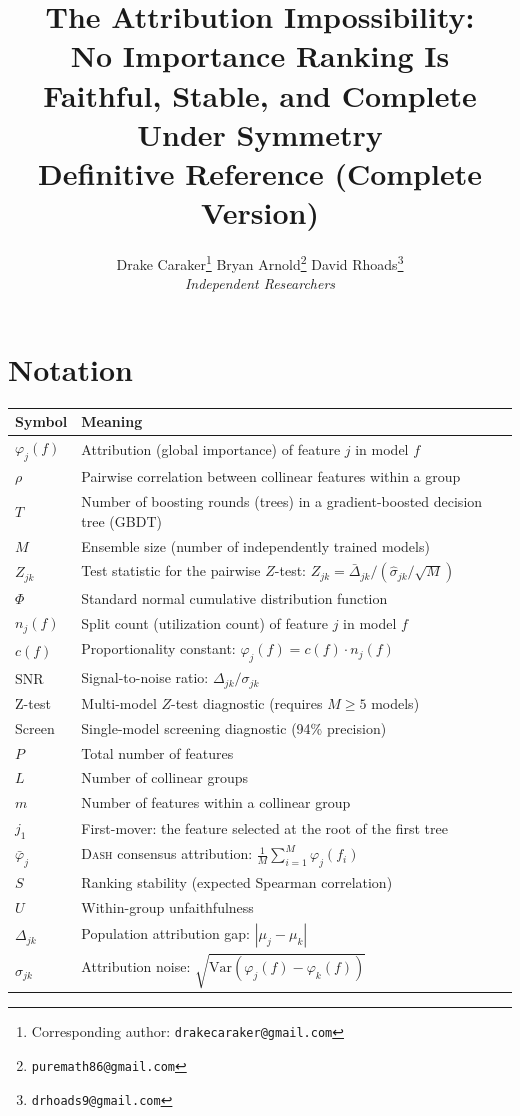 \documentclass{article}
\title{The Attribution Impossibility:\\{\large No Importance Ranking Is Faithful, Stable, and Complete Under Symmetry}\\[8pt]\normalsize Definitive Reference (Complete Version)}
\author{
  Drake Caraker\thanks{Corresponding author: \texttt{drakecaraker@gmail.com}} \quad
  Bryan Arnold\thanks{\texttt{puremath86@gmail.com}} \quad
  David Rhoads\thanks{\texttt{drhoads9@gmail.com}} \\[4pt]
  \textit{Independent Researchers}
}
\newcommand{\Var}{\mathrm{Var}}
\newcommand{\DASH}{\textsc{Dash}}
\begin{document}
\maketitle
\tableofcontents

\section*{Notation}
\label{sec:notation}
\begin{center}
\small
\begin{tabular}{@{}lp{10cm}@{}}
\toprule
\textbf{Symbol} & \textbf{Meaning} \\
\midrule
$\varphi_j(f)$ & Attribution (global importance) of feature $j$ in model $f$ \\
$\rho$ & Pairwise correlation between collinear features within a group \\
$T$ & Number of boosting rounds (trees) in a gradient-boosted decision tree (GBDT) \\
$M$ & Ensemble size (number of independently trained models) \\
$Z_{jk}$ & Test statistic for the pairwise $Z$-test: $Z_{jk} = \bar\Delta_{jk} / (\hat\sigma_{jk}/\sqrt{M})$ \\
$\Phi$ & Standard normal cumulative distribution function \\
$n_j(f)$ & Split count (utilization count) of feature $j$ in model $f$ \\
$c(f)$ & Proportionality constant: $\varphi_j(f) = c(f) \cdot n_j(f)$ \\
$\text{SNR}$ & Signal-to-noise ratio: $\Delta_{jk}/\sigma_{jk}$ \\
Z-test & Multi-model $Z$-test diagnostic (requires $M \geq 5$ models) \\
Screen & Single-model screening diagnostic (94\% precision) \\
$P$ & Total number of features \\
$L$ & Number of collinear groups \\
$m$ & Number of features within a collinear group \\
$j_1$ & First-mover: the feature selected at the root of the first tree \\
$\bar\varphi_j$ & \DASH{} consensus attribution: $\frac{1}{M}\sum_{i=1}^M \varphi_j(f_i)$ \\
$S$ & Ranking stability (expected Spearman correlation) \\
$U$ & Within-group unfaithfulness \\
$\Delta_{jk}$ & Population attribution gap: $|\mu_j - \mu_k|$ \\
$\sigma_{jk}$ & Attribution noise: $\sqrt{\Var(\varphi_j(f) - \varphi_k(f))}$ \\
\bottomrule
\end{tabular}
\end{center}
\end{document}

